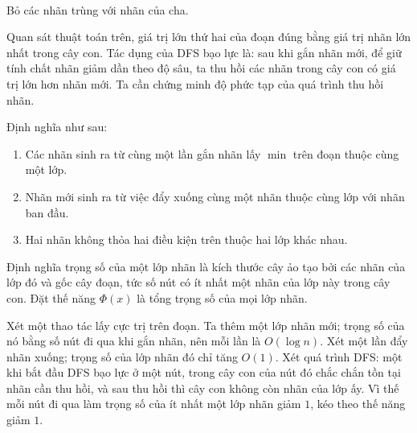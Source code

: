 \documentclass[11pt]{article}
\begin{document}
\begin{center}
\\[-0.2em]
{\small Bỏ các nhãn trùng với nhãn của cha.}
\end{center}

Quan sát thuật toán trên, giá trị lớn thứ hai của đoạn đúng bằng giá trị nhãn
lớn nhất trong cây con. Tác dụng của DFS bạo lực là: sau khi gắn nhãn mới, để
giữ tính chất nhãn giảm dần theo độ sâu, ta thu hồi các nhãn trong cây con có
giá trị lớn hơn nhãn mới. Ta cần chứng minh độ phức tạp của quá trình thu hồi
nhãn.

Định nghĩa  như sau:
\begin{enumerate}
  \item Các nhãn sinh ra từ cùng một lần gắn nhãn lấy \(\min\) trên đoạn
  thuộc cùng một lớp.
  \item Nhãn mới sinh ra từ việc đẩy xuống cùng một nhãn thuộc cùng lớp với
  nhãn ban đầu.
  \item Hai nhãn không thỏa hai điều kiện trên thuộc hai lớp khác nhau.
\end{enumerate}
Định nghĩa trọng số của một lớp nhãn là kích thước cây ảo tạo bởi các nhãn
của lớp đó và gốc cây đoạn, tức số nút có ít nhất một nhãn của lớp này trong
cây con. Đặt thế năng \(\Phi(x)\) là tổng trọng số của mọi lớp nhãn.

Xét một thao tác lấy cực trị trên đoạn. Ta thêm một lớp nhãn mới; trọng số
của nó bằng số nút đi qua khi gắn nhãn, nên mỗi lần là \(O(\log n)\). Xét một
lần đẩy nhãn xuống; trọng số của lớp nhãn đó chỉ tăng \(O(1)\). Xét quá trình
DFS: một khi bắt đầu DFS bạo lực ở một nút, trong cây con của nút đó chắc
chắn tồn tại nhãn cần thu hồi, và sau thu hồi thì cây con không còn nhãn của
lớp ấy. Vì thế mỗi nút đi qua làm trọng số của ít nhất một lớp nhãn giảm
\(1\), kéo theo thế năng giảm \(1\).
\end{document}
